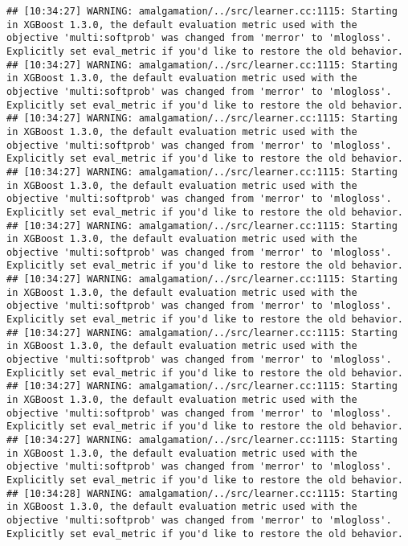 \documentclass[
]{scrbook}
\begin{document}
\begin{verbatim}
## [10:34:27] WARNING: amalgamation/../src/learner.cc:1115: Starting in XGBoost 1.3.0, the default evaluation metric used with the objective 'multi:softprob' was changed from 'merror' to 'mlogloss'. Explicitly set eval_metric if you'd like to restore the old behavior.
## [10:34:27] WARNING: amalgamation/../src/learner.cc:1115: Starting in XGBoost 1.3.0, the default evaluation metric used with the objective 'multi:softprob' was changed from 'merror' to 'mlogloss'. Explicitly set eval_metric if you'd like to restore the old behavior.
## [10:34:27] WARNING: amalgamation/../src/learner.cc:1115: Starting in XGBoost 1.3.0, the default evaluation metric used with the objective 'multi:softprob' was changed from 'merror' to 'mlogloss'. Explicitly set eval_metric if you'd like to restore the old behavior.
## [10:34:27] WARNING: amalgamation/../src/learner.cc:1115: Starting in XGBoost 1.3.0, the default evaluation metric used with the objective 'multi:softprob' was changed from 'merror' to 'mlogloss'. Explicitly set eval_metric if you'd like to restore the old behavior.
## [10:34:27] WARNING: amalgamation/../src/learner.cc:1115: Starting in XGBoost 1.3.0, the default evaluation metric used with the objective 'multi:softprob' was changed from 'merror' to 'mlogloss'. Explicitly set eval_metric if you'd like to restore the old behavior.
## [10:34:27] WARNING: amalgamation/../src/learner.cc:1115: Starting in XGBoost 1.3.0, the default evaluation metric used with the objective 'multi:softprob' was changed from 'merror' to 'mlogloss'. Explicitly set eval_metric if you'd like to restore the old behavior.
## [10:34:27] WARNING: amalgamation/../src/learner.cc:1115: Starting in XGBoost 1.3.0, the default evaluation metric used with the objective 'multi:softprob' was changed from 'merror' to 'mlogloss'. Explicitly set eval_metric if you'd like to restore the old behavior.
## [10:34:27] WARNING: amalgamation/../src/learner.cc:1115: Starting in XGBoost 1.3.0, the default evaluation metric used with the objective 'multi:softprob' was changed from 'merror' to 'mlogloss'. Explicitly set eval_metric if you'd like to restore the old behavior.
## [10:34:27] WARNING: amalgamation/../src/learner.cc:1115: Starting in XGBoost 1.3.0, the default evaluation metric used with the objective 'multi:softprob' was changed from 'merror' to 'mlogloss'. Explicitly set eval_metric if you'd like to restore the old behavior.
## [10:34:28] WARNING: amalgamation/../src/learner.cc:1115: Starting in XGBoost 1.3.0, the default evaluation metric used with the objective 'multi:softprob' was changed from 'merror' to 'mlogloss'. Explicitly set eval_metric if you'd like to restore the old behavior.

\end{verbatim}
\end{document}
